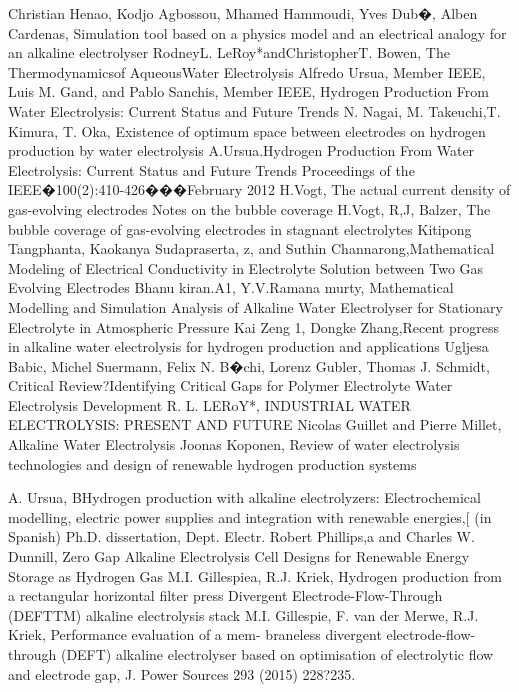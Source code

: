 \begin{thebibliography}{9}
Christian Henao, Kodjo Agbossou, Mhamed Hammoudi, Yves Dub�, Alben Cardenas, Simulation tool based on a physics model and an electrical analogy for an alkaline electrolyser
RodneyL. LeRoy*andChristopherT. Bowen, The Thermodynamicsof AqueousWater Electrolysis
Alfredo Ursua, Member IEEE, Luis M. Gand, and Pablo Sanchis, Member IEEE, Hydrogen Production From
Water Electrolysis: Current Status and Future Trends
N. Nagai, M. Takeuchi,T. Kimura, T. Oka, Existence of optimum space between electrodes on hydrogen production by water electrolysis
A.Ursua.Hydrogen Production From Water Electrolysis: Current Status and Future Trends Proceedings of the IEEE�100(2):410-426���February 2012
H.Vogt, The actual current density of gas-evolving electrodes Notes on the bubble coverage
H.Vogt, R,J, Balzer, The bubble coverage of gas-evolving electrodes in stagnant electrolytes
Kitipong Tangphanta, Kaokanya Sudapraserta, z, and Suthin Channarong,Mathematical Modeling of Electrical Conductivity
in Electrolyte Solution between Two Gas Evolving Electrodes
Bhanu kiran.A1, Y.V.Ramana murty, Mathematical Modelling and Simulation Analysis of Alkaline Water Electrolyser for Stationary Electrolyte in Atmospheric Pressure
Kai Zeng 1, Dongke Zhang,Recent progress in alkaline water electrolysis for hydrogen production and applications
Ugljesa Babic, Michel Suermann, Felix N. B�chi, Lorenz Gubler, Thomas J. Schmidt, Critical Review?Identifying Critical Gaps for Polymer Electrolyte Water Electrolysis Development
R. L. LERoY*, INDUSTRIAL WATER ELECTROLYSIS: PRESENT AND FUTURE
Nicolas Guillet and Pierre Millet, Alkaline Water Electrolysis
Joonas Koponen, Review of water electrolysis technologies and design of renewable hydrogen production systems

A. Ursua, BHydrogen production with alkaline electrolyzers: Electrochemical modelling, electric power supplies
and integration with renewable energies,[ (in Spanish) Ph.D. dissertation, Dept. Electr.
Robert Phillips,a and Charles W. Dunnill,  Zero Gap Alkaline Electrolysis Cell Designs for
 Renewable Energy Storage as Hydrogen Gas
M.I. Gillespiea, R.J. Kriek, Hydrogen production from a rectangular horizontal filter press Divergent Electrode-Flow-Through (DEFTTM) alkaline electrolysis stack
M.I. Gillespie, F. van der Merwe, R.J. Kriek, Performance evaluation of a mem-
braneless divergent electrode-flow-through (DEFT) alkaline electrolyser based on optimisation of electrolytic flow and electrode gap, J. Power Sources 293 (2015) 228?235.


\end{thebibliography}
